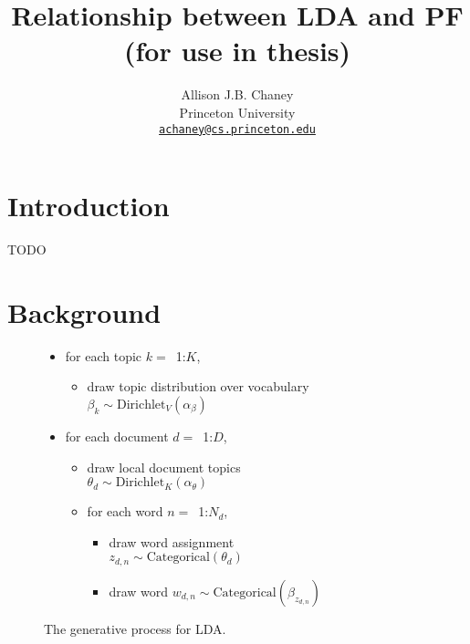 \documentclass[11pt,letterpaper]{article}
\title{Relationship between LDA and PF \\ (for use in thesis)}
\author{
Allison J.B. Chaney\\
    Princeton University\\
	\href{mailto:achaney@cs.princeton.edu}{\nolinkurl{achaney@cs.princeton.edu}}
}
\date{}
\begin{document}
\maketitle


\section{Introduction}
TODO

\section{Background}

\begin{figure}
\begin{mdframed}
\small
\begin{itemize}[leftmargin=*]
\item for each topic $k=$~1:$K$,
	\begin{itemize}[leftmargin=*]
		\item draw topic distribution over vocabulary \\$\beta_k \sim \mbox{Dirichlet}_V (\alpha_\beta)$
	\end{itemize}
\item for each document $d=$~1:$D$,
	\begin{itemize}[leftmargin=*]
		\item draw local document topics \\$\theta_d \sim \mbox{Dirichlet}_K(\alpha_\theta)$
		\item for each word $n=$~1:$N_d$,
		\begin{itemize}[leftmargin=*]
			\item draw word assignment \\$z_{d,n} \sim \mbox{Categorical}\left(\theta_d\right)$
			\item draw word $w_{d,n} \sim \mbox{Categorical}\left(\beta_{z_{d,n}}\right)$
		\end{itemize}
	\end{itemize}
\end{itemize}
\end{mdframed}
\caption{The generative process for LDA.}
\label{fig:generative-LDA}
\end{figure}
\end{document}
